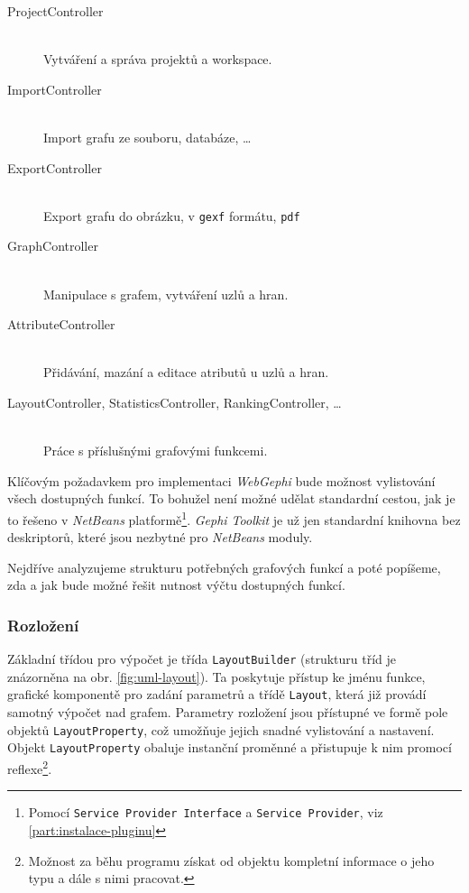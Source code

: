 \documentclass[thesis=M,czech]{FITthesis}[2014/05/6]
\begin{document}
\begin{description}
  \item[ProjectController] \hfill \\
  Vytváření a správa projektů a workspace.
  \item[ImportController] \hfill \\
  Import grafu ze souboru, databáze, \ldots
  \item[ExportController] \hfill \\
  Export grafu do obrázku, v \texttt{gexf} formátu, \texttt{pdf}
  \item[GraphController] \hfill \\
  Manipulace s grafem, vytváření uzlů a hran.
 \item[AttributeController] \hfill \\
  Přidávání, mazání a editace atributů u uzlů a hran.
  \item[LayoutController, StatisticsController, RankingController, \ldots] \hfill \\
  Práce s příslušnými grafovými funkcemi.
\end{description}

Klíčovým požadavkem pro implementaci \textit{WebGephi} bude možnost vylistování všech dostupných funkcí.
To bohužel není možné udělat standardní cestou, jak je to řešeno v \textit{NetBeans} platformě\footnote{Pomocí \texttt{Service Provider Interface} a \texttt{Service Provider}, viz \ref{part:instalace-pluginu}}. 
\textit{Gephi Toolkit} je už jen standardní knihovna bez deskriptorů, které jsou nezbytné pro \textit{NetBeans} moduly.

Nejdříve analyzujeme strukturu potřebných grafových funkcí a poté popíšeme, zda a jak bude možné řešit nutnost výčtu dostupných funkcí.

\subsubsection{Rozložení}
Základní třídou pro výpočet  je třída \texttt{LayoutBuilder} (strukturu tříd je znázorněna na obr. \ref{fig:uml-layout}). Ta poskytuje přístup ke jménu funkce, grafické komponentě pro zadání parametrů a
třídě \texttt{Layout}, která již provádí samotný výpočet nad grafem. Parametry rozložení jsou přístupné ve formě pole objektů \texttt{LayoutProperty},
což umožňuje jejich snadné vylistování a nastavení. Objekt \texttt{LayoutProperty} obaluje instanční proměnné a přistupuje k nim promocí reflexe\footnote{Možnost 
za běhu programu získat od objektu kompletní informace o jeho typu a dále s nimi pracovat.}.
\end{document}
